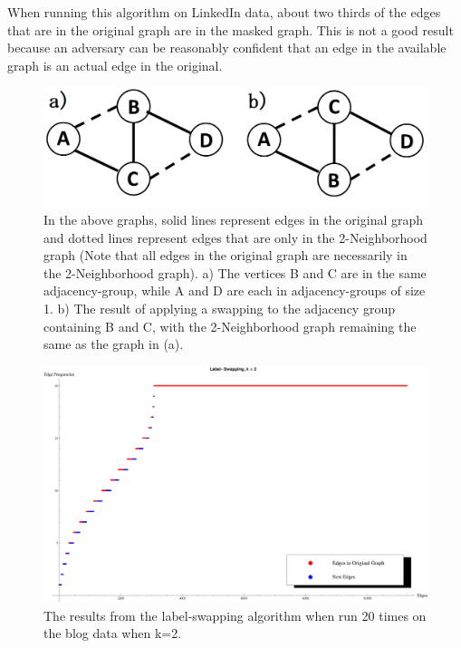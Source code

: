 \indent When running this algorithm on LinkedIn data, about two thirds of the edges that are in the original graph are in the masked graph. This is not a good result because an adversary can be reasonably confident that an edge in the available graph is an actual edge in the original. \\

\begin{figure}[ht]
  \centering
  \includegraphics[scale=0.3 ]{Sample-Graph.png}
  \caption{In the above graphs, solid lines represent edges in the original graph and dotted lines represent edges that are only in the 2-Neighborhood graph (Note that all edges in the original graph are necessarily in the 2-Neighborhood graph). a)  The vertices B and C are in the same adjacency-group, while A and D are each in adjacency-groups of size 1. b) The result of applying a swapping to the adjacency group containing B and C, with the 2-Neighborhood graph remaining the same as the graph in (a).}
  \label{fig:sample graph}
\end{figure}


\begin{figure}[ht]
  \centering
  \includegraphics[scale=0.4 ]{s40_k_2_nomerge.eps}
  \caption{The results from the label-swapping algorithm when run 20 times on the blog data when k=2.}
  \label{fig:s40-k=2-label-swap}
\end{figure}



